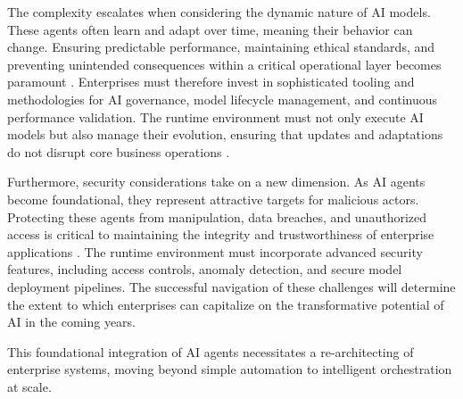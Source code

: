 The complexity escalates when considering the dynamic nature of AI models. These agents often learn and adapt over time, meaning their behavior can change. Ensuring predictable performance, maintaining ethical standards, and preventing unintended consequences within a critical operational layer becomes paramount \cite{Reger2026}. Enterprises must therefore invest in sophisticated tooling and methodologies for AI governance, model lifecycle management, and continuous performance validation. The runtime environment must not only execute AI models but also manage their evolution, ensuring that updates and adaptations do not disrupt core business operations \cite{Gartner2025}.

Furthermore, security considerations take on a new dimension. As AI agents become foundational, they represent attractive targets for malicious actors. Protecting these agents from manipulation, data breaches, and unauthorized access is critical to maintaining the integrity and trustworthiness of enterprise applications \cite{Reger2026}. The runtime environment must incorporate advanced security features, including access controls, anomaly detection, and secure model deployment pipelines. The successful navigation of these challenges will determine the extent to which enterprises can capitalize on the transformative potential of AI in the coming years.

This foundational integration of AI agents necessitates a re-architecting of enterprise systems, moving beyond simple automation to intelligent orchestration at scale.
